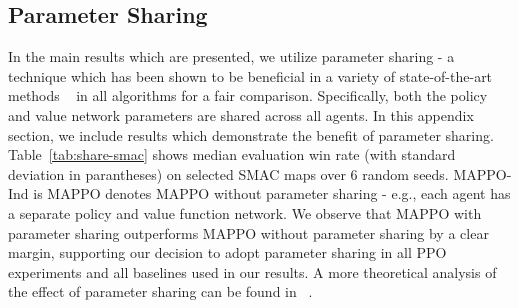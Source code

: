 \subsection{Parameter Sharing}\label{app:sharing}
In the main results which are presented, we utilize parameter sharing - a technique which has been shown to be beneficial in a variety of state-of-the-art methods ~\cite{christianos2021scaling, terry2021revisiting} in all algorithms for a fair comparison. Specifically, both the policy and value network parameters are shared across all agents. In this appendix section, we include results which demonstrate the benefit of parameter sharing. Table~\ref{tab:share-smac} shows median evaluation win rate (with standard deviation in parantheses) on selected SMAC maps over 6 random seeds. MAPPO-Ind is MAPPO denotes MAPPO without parameter sharing - e.g., each agent has a separate policy and value function network. We observe that MAPPO with parameter sharing outperforms MAPPO without parameter sharing by a clear margin, supporting our decision to adopt parameter sharing in all PPO experiments and all baselines used in our results. A more theoretical analysis of the effect of parameter sharing can be found in ~\cite{https://doi.org/10.48550/arxiv.2206.07505}.



